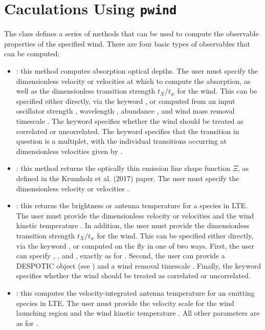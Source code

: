 \documentclass[letterpaper,10pt,english]{sphinxmanual}
\begin{document}
\section{Caculations Using \texttt{pwind}}
\label{winds:caculations-using-pwind}
The  class defines a series of methods that can be used to
compute the observable properties of the specified wind. There are
four basic types of observables that can be computed:
\begin{itemize}
\item {} 
: this method computes absorption optical depths. The
user must specify the dimensionless velocity or velocities  at
which to compute the absorption, as well as the dimensionless
transition strength \(t_X/t_w\) for the wind. This can be
specified either directly, via the keyword , or computed
from an input oscillator strength , wavelength
, abundance , and wind mass removal timescale
. The keyword  specifies whether the wind should
be treated as correlated or uncorrelated. The keyword 
specifies that the transition in question is a multiplet, with
the individual transitions occurring at dimensionless velocities
given by .

\item {} 
: this method returns the optically thin emission line
shape function \(\Xi\), as defined in the Krumholz et al. (2017)
paper. The user must specify the dimensionless velocity or
velocities .

\item {} 
: this returns the brightness or antenna
temperature for a species in LTE. The user must provide the
dimensionless velocity or velocities  and the wind kinetic
temperature . In addition, the user must provide the dimensionless
transition strength \(t_X/t_w\) for the wind. This can be
specified either directly, via the keyword , or computed
on the fly in one of two ways. First, the user can specify
, ,  and , exactly as for
. Second, the user can provide a DESPOTIC 
object (see {\hyperref[fulldoc:sssec\string-full\string-emitter]{}}) and a wind removal timescale
. Finally, the keyword  specifies whether the
wind should be treated as correlated or uncorrelated.

\item {} 
: this computes the velocity-integrated antenna
temperature for an emitting species in LTE. The user must provide
the velocity scale  for the wind launching region and the wind
kinetic temperature . All other parameters are as for
.

\end{itemize}
\end{document}
